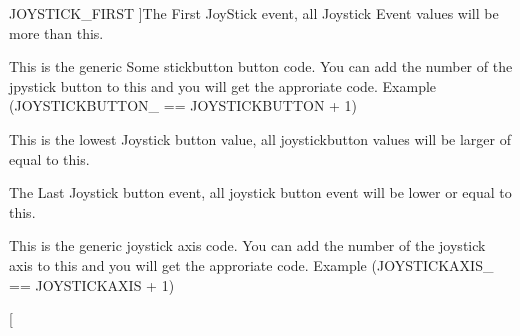 \begin{Desc}
\begin{description}
{\hypertarget{classphys_1_1MetaCode_a3e501cbb5bf0f6f1fdb7211465bda8d8a666e564cae666de739b9b3cf047ec578}{
JOYSTICK\_\-FIRST}
\label{da/dc9/classphys_1_1MetaCode_a3e501cbb5bf0f6f1fdb7211465bda8d8a666e564cae666de739b9b3cf047ec578}
}]The First JoyStick event, all Joystick Event values will be more than this. \item[{\em 
\hypertarget{classphys_1_1MetaCode_a3e501cbb5bf0f6f1fdb7211465bda8d8aaaa2af6a60a9cd7403aa4786ef1ea389}{
JOYSTICKBUTTON}
\label{da/dc9/classphys_1_1MetaCode_a3e501cbb5bf0f6f1fdb7211465bda8d8aaaa2af6a60a9cd7403aa4786ef1ea389}
}]This is the generic Some stickbutton button code. You can add the number of the jpystick button to this and you will get the approriate code. Example (JOYSTICKBUTTON\_ == JOYSTICKBUTTON + 1) \item[{\em 
\hypertarget{classphys_1_1MetaCode_a3e501cbb5bf0f6f1fdb7211465bda8d8a88e7d7302a93326fdcc2181f96dc878e}{
JOYSTICKBUTTON\_\-FIRST}
\label{da/dc9/classphys_1_1MetaCode_a3e501cbb5bf0f6f1fdb7211465bda8d8a88e7d7302a93326fdcc2181f96dc878e}
}]This is the lowest Joystick button value, all joystickbutton values will be larger of equal to this. \item[{\em 
\hypertarget{classphys_1_1MetaCode_a3e501cbb5bf0f6f1fdb7211465bda8d8a527375f3b27437b82cffd7c5fc2a14ac}{
JOYSTICKBUTTON\_\-LAST}
\label{da/dc9/classphys_1_1MetaCode_a3e501cbb5bf0f6f1fdb7211465bda8d8a527375f3b27437b82cffd7c5fc2a14ac}
}]The Last Joystick button event, all joystick button event will be lower or equal to this. \item[{\em 
\hypertarget{classphys_1_1MetaCode_a3e501cbb5bf0f6f1fdb7211465bda8d8ab4e0e44b1cad95e292e9e436f3e59e0a}{
JOYSTICKAXIS}
\label{da/dc9/classphys_1_1MetaCode_a3e501cbb5bf0f6f1fdb7211465bda8d8ab4e0e44b1cad95e292e9e436f3e59e0a}
}]This is the generic joystick axis code. You can add the number of the joystick axis to this and you will get the approriate code. Example (JOYSTICKAXIS\_ == JOYSTICKAXIS + 1) \item[{\em 
}
\end{description}
\end{Desc}
